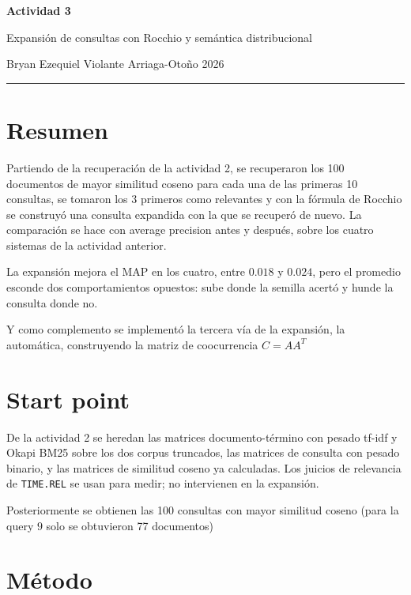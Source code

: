 \documentclass[11pt,letterpaper]{article}
\newcommand{\periodo}{Otoño 2026}
\newcommand{\alumno}{Bryan Ezequiel Violante Arriaga}
\begin{document}

\begin{center}
  {\LARGE\bfseries Actividad 3\par}
  \vspace{0.3em}
  {\large Expansión de consultas con Rocchio y semántica
   distribucional\par}
  \vspace{0.5em}
  {\small \alumno \quad-\quad \periodo\par}
  \vspace{0.4em}
  \rule{\linewidth}{0.5pt}
\end{center}

\section*{Resumen}

Partiendo de la recuperación de la actividad 2, se recuperaron los
100 documentos de mayor similitud coseno para cada una de las primeras
10 consultas, se tomaron los 3 primeros como relevantes y con la
fórmula de Rocchio se construyó una consulta expandida con la que se
recuperó de nuevo. La comparación se hace con average precision antes
y después, sobre los cuatro sistemas de la actividad anterior.

La expansión mejora el MAP en los cuatro, entre $0.018$ y $0.024$,
pero el promedio esconde dos comportamientos opuestos: sube donde la
semilla acertó y hunde la consulta donde no.

Y como complemento se implementó la tercera vía de la expansión, la automática, construyendo
la matriz de coocurrencia $C = A A^{T}$

\section{Start point}

De la actividad 2 se heredan las matrices documento-término con pesado
tf-idf y Okapi BM25 sobre los dos corpus truncados, las matrices de
consulta con pesado binario, y las matrices de similitud coseno ya
calculadas. Los juicios de relevancia de \texttt{TIME.REL} se usan
para medir; no intervienen en la expansión.

Posteriormente se obtienen las 100 consultas con mayor similitud coseno 
(para la query $9$ solo se obtuvieron 77 documentos)

\section{Método}
\end{document}
